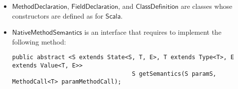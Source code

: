\documentclass[11pt]{article}
\newcommand{\statement}[1]{\ensuremath{\mathsf{#1}}}
\newcommand{\Scala}{\ensuremath{\mathsf{Scala}}}
\begin{document}
\begin{itemize}
\item \statement{MethodDeclaration}, \statement{FieldDeclaration}, and \statement{ClassDefinition} are classes whose constructors are defined as for \Scala.

\item \statement{NativeMethodSemantics} is an interface that requires to implement the following method:
\begin{lstlisting}
public abstract <S extends State<S, T, E>, T extends Type<T>, E extends Value<T, E>> 
                                  S getSemantics(S paramS, MethodCall<T> paramMethodCall);
\end{lstlisting}

\end{itemize}
\end{document}
